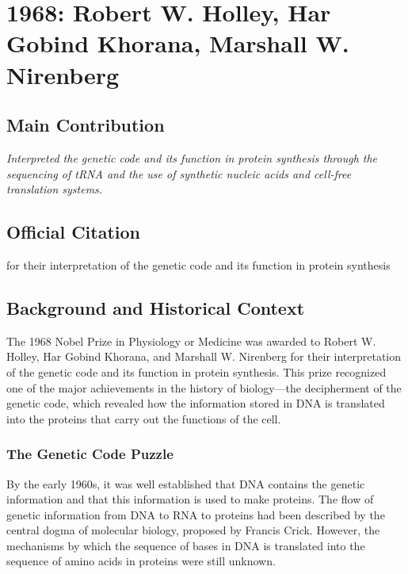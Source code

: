 \chapter[1968 --- Holley, Khorana, and Nirenberg]{1968: Robert W. Holley, Har Gobind Khorana, Marshall W. Nirenberg}
\label{ch:1968_Holley}

\section*{Main Contribution}

\textit{Interpreted the genetic code and its function in protein synthesis through the sequencing of tRNA and the use of synthetic nucleic acids and cell-free translation systems.}\cite{nobel-1968,lecture-1968,lecture-khorana-1968,lecture-nirenberg-1968}

\section{Official Citation}

for their interpretation of the genetic code and its function in protein synthesis

\section{Background and Historical Context}

The 1968 Nobel Prize in Physiology or Medicine was awarded to Robert W. Holley, Har Gobind Khorana, and Marshall W. Nirenberg for their interpretation of the genetic code and its function in protein synthesis. This prize recognized one of the major achievements in the history of biology---the decipherment of the genetic code, which revealed how the information stored in DNA is translated into the proteins that carry out the functions of the cell.

\subsection{The Genetic Code Puzzle}

By the early 1960s, it was well established that DNA contains the genetic information and that this information is used to make proteins. The flow of genetic information from DNA to RNA to proteins had been described by the central dogma of molecular biology, proposed by Francis Crick. However, the mechanisms by which the sequence of bases in DNA is translated into the sequence of amino acids in proteins were still unknown.


